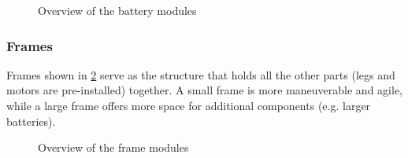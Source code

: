 \documentclass[sigconf,review]{acmart}
\begin{document}
\begin{figure}[htbp]
    \hfill
    \hfill
    \caption{Overview of the battery modules}
    \label{fig:batteries}
\end{figure}

\subsubsection{Frames}
\label{sec:frames}

Frames shown in \cref{fig:frames} serve as the structure that holds all the other parts (legs and motors are pre-installed) together. 
A small frame is more maneuverable and agile, while a large frame offers more space for additional components (e.g. larger batteries).

\begin{figure}[htbp]
    \hfill
    \caption{Overview of the frame modules}
    \label{fig:frames}
\end{figure}
\end{document}
